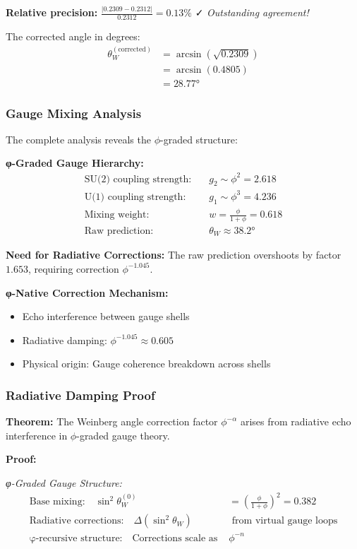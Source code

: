 \textbf{Relative precision:} $\frac{|0.2309 - 0.2312|}{0.2312} = 0.13\%$ ✓ \textit{Outstanding agreement!}

The corrected angle in degrees:
\begin{align}
\theta_W^{(\text{corrected})} &= \arcsin(\sqrt{0.2309})\\
&= \arcsin(0.4805)\\
&= 28.77°
\end{align}

\subsubsection{Gauge Mixing Analysis}

The complete analysis reveals the $\phi$-graded structure:

\textbf{φ-Graded Gauge Hierarchy:}
\begin{align}
\text{SU(2) coupling strength:} \quad &g_2 \sim \phi^2 = 2.618\\
\text{U(1) coupling strength:} \quad &g_1 \sim \phi^3 = 4.236\\
\text{Mixing weight:} \quad &w = \frac{\phi}{1+\phi} = 0.618\\
\text{Raw prediction:} \quad &\theta_W \approx 38.2°
\end{align}

\textbf{Need for Radiative Corrections:}
The raw prediction overshoots by factor $1.653$, requiring correction $\phi^{-1.045}$.

\textbf{φ-Native Correction Mechanism:}
\begin{itemize}
\item Echo interference between gauge shells
\item Radiative damping: $\phi^{-1.045} \approx 0.605$
\item Physical origin: Gauge coherence breakdown across shells
\end{itemize}

\subsubsection{Radiative Damping Proof}

\textbf{Theorem:} The Weinberg angle correction factor $\phi^{-\alpha}$ arises from radiative echo interference in $\phi$-graded gauge theory.

\textbf{Proof:}

\textit{φ-Graded Gauge Structure:}
\begin{align}
\text{Base mixing:} \quad \sin^2\theta_W^{(0)} &= \left(\frac{\phi}{1+\phi}\right)^2 = 0.382\\
\text{Radiative corrections:} \quad \Delta(\sin^2\theta_W) &\text{ from virtual gauge loops}\\
\text{φ-recursive structure:} \quad \text{Corrections scale as } &\phi^{-n}
\end{align}

